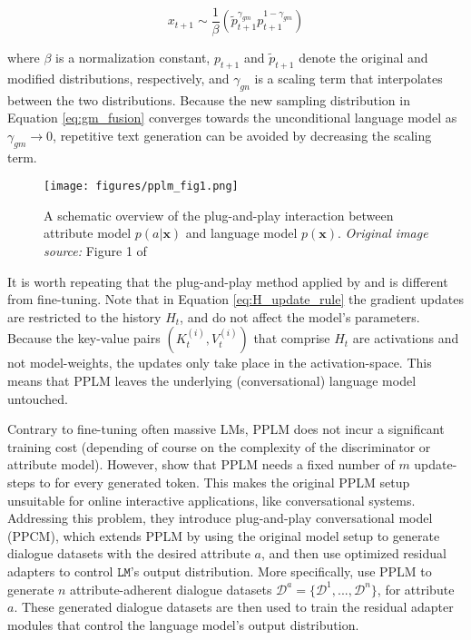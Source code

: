 \begin{equation}
    x_{t + 1} \sim \frac{1}{\beta}
    \left( 
    \tilde{p}_{t + 1}^{\gamma_{gm}} p_{t + 1}^{1 - \gamma_{gm}}
    \right)
    \label{eq:gm_fusion}
\end{equation}

where $\beta$ is a normalization constant, $p_{t + 1}$ and $\tilde{p}_{t + 1}$ denote the original and modified distributions, respectively, and $\gamma_{gn}$ is a scaling term that interpolates between the two distributions. Because the new sampling distribution in Equation \ref{eq:gm_fusion} converges towards the unconditional language model as $\gamma_{gm} \rightarrow 0$, repetitive text generation can be avoided by decreasing the scaling term.


\begin{figure}[H]
    \centering
    \texttt{[image: figures/pplm\_fig1.png]}
    \caption{A schematic overview of the plug-and-play interaction between attribute model $p(a | \textbf{x})$ and language model $p(\textbf{x})$. \textit{Original image source:} Figure 1 of \cite{dathathri2019plug}}
    \label{fig:pplm_schematic_overview}
\end{figure}



It is worth repeating that the plug-and-play method applied by \cite{dathathri2019plug} and \cite{madotto-etal-2020-plug} is different from fine-tuning. Note that in Equation \ref{eq:H_update_rule} the gradient updates are restricted to the history $H_t$, and do not affect the model's parameters. Because the key-value pairs $(K_t^{(i)}, V_t^{(i)})$ that comprise $H_t$ are activations and not model-weights, the updates only take place in the activation-space. This means that PPLM leaves the underlying (conversational) language model untouched.

Contrary to fine-tuning often massive LMs, PPLM does not incur a significant training cost (depending of course on the complexity of the discriminator or attribute model). However, \cite{madotto-etal-2020-plug} show that PPLM needs a fixed number of $m$ update-steps to for every generated token. This makes the original PPLM setup unsuitable for online interactive applications, like conversational systems. Addressing this problem, they introduce plug-and-play conversational model (PPCM), which extends PPLM by using the original model setup to generate dialogue datasets with the desired attribute $a$, and then use optimized residual adapters \citep{bapna-firat-2019-simple} to control $\texttt{LM}$'s output distribution. More specifically, \cite{madotto-etal-2020-plug} use PPLM to generate $n$ attribute-adherent dialogue datasets $\mathscr{D}^a = \{\mathcal{D}^1, ..., \mathcal{D}^n\}$, for attribute $a$. These generated dialogue datasets are then used to train the residual adapter modules that control the language model's output distribution.

